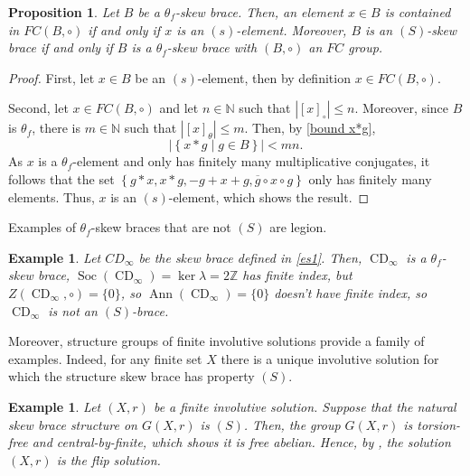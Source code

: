 \documentclass{amsart}
\newcommand{\Z}{\mathbb{Z}}
\newcommand{\N}{\mathbb{N}}
\newcommand{\Ann}{\operatorname{Ann}}
\newcommand{\Soc}{\operatorname{Soc}}
\newcommand{\CD}{\operatorname{CD}}
\newtheorem{pro}[thm]{Proposition}
\newtheorem{exa}[thm]{Example}
\begin{document}
\begin{pro}
\label{S = thetaf and mult FC}
    Let $B$ be a $\theta_f$-skew brace. Then, an element $x \in B$ is contained in $FC(B,\circ)$ if and only if $x$ is an $(s)$-element. Moreover, $B$ is an $(S)$-skew brace if and only if $B$ is a $\theta_f$-skew brace with $(B,\circ)$ an $FC$ group.
\end{pro}
\begin{proof}
    First, let $x \in B$ be an $(s)$-element, then by definition $x \in FC(B,\circ)$.

    Second, let $x \in FC(B,\circ)$ and let $n\in \N$ such that
    $|[x]_\circ |\leq n$. 
    Moreover, since $B$ is $\theta_f$, there is $m\in \N$ such that
    $|[x]_\theta|\leq m$.
    Then, by \cref{bound x*g},
    \[
      |\left\lbrace x*g \mid g \in B\right\rbrace|<mn.
    \]
    As $x$ is a $\theta_f$-element and only has finitely many multiplicative conjugates, it follows that the set $\left\lbrace g*x,x*g,-g+x+g, \overline{g} \circ x \circ g\right\rbrace $ only has finitely many elements. Thus, $x$ is an $(s)$-element, which shows the result.
\end{proof}

Examples of $\theta_f$-skew braces that are not $(S)$ are legion.

\begin{exa}
Let $CD_{\infty}$ be the skew brace defined in \cref{es1}. Then, $\CD_\infty$ is a $\theta_f$-skew brace,
$\Soc(\CD_\infty)=\ker\lambda=2\Z$ has finite index, but $Z(\CD_\infty,\circ)=\{0\}$, 
so $\Ann(\CD_\infty)=\{0\}$ doesn't have finite index, so $\CD_\infty$ is not an $(S)$-brace.
\end{exa}

Moreover, structure groups of finite involutive solutions provide a family of examples. Indeed, for any finite set $X$ there is a unique involutive solution for which the structure skew brace has property $(S)$.

\begin{exa}
    Let $(X,r)$ be a finite involutive solution. Suppose that the natural skew brace structure on $G(X,r)$ is $(S)$. Then, the group $G(X,r)$ is torsion-free and central-by-finite, which shows it is free abelian. Hence, by \cite{MR3974961}, the solution $(X,r)$ is the flip solution.
\end{exa}
\end{document}
